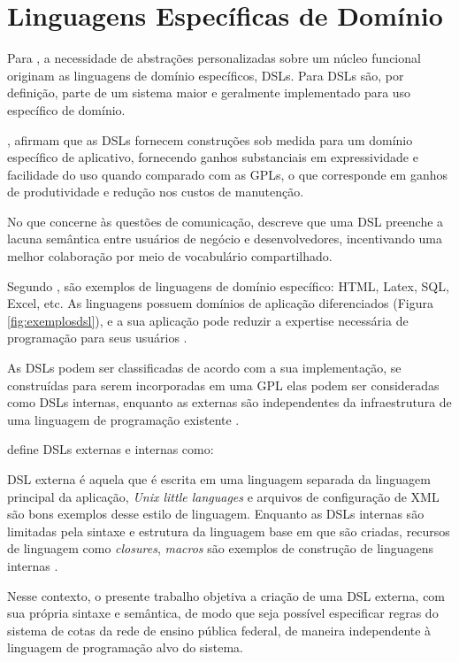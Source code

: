 \section{Linguagens Específicas de Domínio}
\label{sec:dsl}

Para , a necessidade de abstrações personalizadas sobre um núcleo funcional originam as linguagens de domínio específicos, \gls{DSL}s. Para  \gls{DSL}s são, por definição, parte de um sistema maior e geralmente implementado para uso específico de domínio.

, afirmam que as \gls{DSL}s fornecem construções sob medida para um domínio específico de aplicativo, fornecendo ganhos substanciais em expressividade e facilidade do uso quando comparado com as \gls{GPL}s, o que corresponde em ganhos de produtividade e redução nos custos de manutenção.

No que concerne às questões de comunicação,  descreve que uma \gls{DSL} preenche a lacuna semântica entre usuários de negócio e desenvolvedores, incentivando uma melhor colaboração por meio de vocabulário compartilhado.  

Segundo , são exemplos de linguagens de domínio específico: HTML, Latex, SQL, Excel, etc. As linguagens possuem domínios de aplicação diferenciados (Figura \ref{fig:exemplosdsl}), e a sua aplicação pode reduzir a expertise necessária de programação para seus usuários .




As \gls{DSL}s podem ser classificadas de acordo com a sua implementação, se construídas para serem incorporadas em uma \gls{GPL} elas podem ser consideradas como \gls{DSL}s internas, enquanto as externas são independentes da infraestrutura de uma linguagem de programação existente \cite{dslengineering}.

 define \gls{DSL}s externas e internas como:

\begin{citacao} 
\gls{DSL} externa é aquela que é escrita em uma linguagem separada da linguagem principal da aplicação, \textit{Unix little languages} e arquivos de configuração de \gls{XML} são bons exemplos desse estilo de linguagem. Enquanto as \gls{DSL}s internas são limitadas pela sintaxe e estrutura da linguagem base em que são criadas, recursos de linguagem como \textit{closures}, \textit{macros} são exemplos de construção de linguagens internas \cite[s/p, tradução nossa]{fowler2005language}.
\end{citacao}


Nesse contexto, o presente trabalho objetiva a criação de uma \gls{DSL} externa, com sua própria sintaxe e semântica, de modo que seja possível especificar regras do sistema de cotas da rede de ensino pública federal, de maneira independente à linguagem de programação alvo do sistema. 



